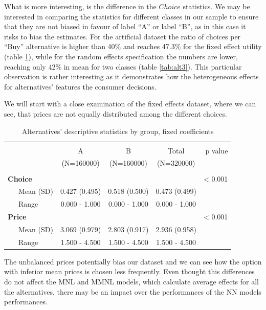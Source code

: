 \documentclass[12pt,]{article}
\begin{document}
What is more interesting, is the difference in the \(Choice\)
statistics. We may be interested in comparing the statistics for
different classes in our sample to ensure that they are not biased in
favour of label ``A'' or label ``B'', as in this case it risks to bias
the estimates. For the artificial dataset the ratio of choices per
``Buy'' alternative is higher than 40\% and reaches 47.3\% for the fixed
effect utility (table \ref{tab:alt2}), while for the random effects
specification the numbers are lower, reaching only 42\% in mean for two
classes (table \ref{tab:alt3}). This particular observation is rather
interesting as it demonstrates how the heterogeneous effects for
alternatives' features the consumer decisions.

We will start with a close examination of the fixed effects dataset,
where we can see, that prices are not equally distributed among the
different choices.

\begin{table}[!htbp] \centering 
  \caption{Alternatives' descriptive statistics by group, fixed coefficients} 
  \label{tab:alt2} 
\begin{tabular}{@{\extracolsep{5pt}}lcccr}
\\[-1.8ex]\hline 
\hline \\[-1.8ex] 
 & A  & B  & Total  & p value\\
 & (N=160000) & (N=160000) & (N=320000) &  \\
\hline \\[-1.8ex] 
\textbf{Choice} &  &  &  & < 0.001\\
~~~Mean (SD) & 0.427 (0.495) & 0.518 (0.500) & 0.473 (0.499) & \\
~~~Range & 0.000 - 1.000 & 0.000 - 1.000 & 0.000 - 1.000 & \\
\textbf{Price} &  &  &  & < 0.001\\
~~~Mean (SD) & 3.069 (0.979) & 2.803 (0.917) & 2.936 (0.958) & \\
~~~Range & 1.500 - 4.500 & 1.500 - 4.500 & 1.500 - 4.500 & \\
\hline
\end{tabular}
\end{table}

The unbalanced prices potentially bias our dataset and we can see how
the option with inferior mean prices is chosen less frequently. Even
thought this differences do not affect the MNL and MMNL models, which
calculate average effects for all the alternatives, there may be an
impact over the performances of the NN models performances.
\end{document}
